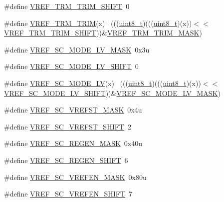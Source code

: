 \begin{DoxyCompactItemize}
\#define \hyperlink{group___v_r_e_f___register___masks_ga7738b4edb18c8c9dcb36d6be564c80e6}{V\+R\+E\+F\+\_\+\+T\+R\+M\+\_\+\+T\+R\+I\+M\+\_\+\+S\+H\+I\+FT}~0
\item 
\#define \hyperlink{group___v_r_e_f___register___masks_gac340a7abf4c9caf1594346d71a475a30}{V\+R\+E\+F\+\_\+\+T\+R\+M\+\_\+\+T\+R\+IM}(x)                                              ~(((\hyperlink{_p_e___types_8h_aba7bc1797add20fe3efdf37ced1182c5}{uint8\+\_\+t})(((\hyperlink{_p_e___types_8h_aba7bc1797add20fe3efdf37ced1182c5}{uint8\+\_\+t})(x))$<$$<$\hyperlink{group___v_r_e_f___register___masks_ga7738b4edb18c8c9dcb36d6be564c80e6}{V\+R\+E\+F\+\_\+\+T\+R\+M\+\_\+\+T\+R\+I\+M\+\_\+\+S\+H\+I\+FT}))\&\hyperlink{group___v_r_e_f___register___masks_gaf233ddf56401003ec721b808d3910978}{V\+R\+E\+F\+\_\+\+T\+R\+M\+\_\+\+T\+R\+I\+M\+\_\+\+M\+A\+SK})
\item 
\#define \hyperlink{group___v_r_e_f___register___masks_ga7eb8ab4b25ed9f93b23d7199c50e7181}{V\+R\+E\+F\+\_\+\+S\+C\+\_\+\+M\+O\+D\+E\+\_\+\+L\+V\+\_\+\+M\+A\+SK}~0x3u
\item 
\#define \hyperlink{group___v_r_e_f___register___masks_ga3130891ca865a042a784a2c3bc7141b0}{V\+R\+E\+F\+\_\+\+S\+C\+\_\+\+M\+O\+D\+E\+\_\+\+L\+V\+\_\+\+S\+H\+I\+FT}~0
\item 
\#define \hyperlink{group___v_r_e_f___register___masks_gada46f0a4d5c228d2193c8f292631265f}{V\+R\+E\+F\+\_\+\+S\+C\+\_\+\+M\+O\+D\+E\+\_\+\+LV}(x)                                          ~(((\hyperlink{_p_e___types_8h_aba7bc1797add20fe3efdf37ced1182c5}{uint8\+\_\+t})(((\hyperlink{_p_e___types_8h_aba7bc1797add20fe3efdf37ced1182c5}{uint8\+\_\+t})(x))$<$$<$\hyperlink{group___v_r_e_f___register___masks_ga3130891ca865a042a784a2c3bc7141b0}{V\+R\+E\+F\+\_\+\+S\+C\+\_\+\+M\+O\+D\+E\+\_\+\+L\+V\+\_\+\+S\+H\+I\+FT}))\&\hyperlink{group___v_r_e_f___register___masks_ga7eb8ab4b25ed9f93b23d7199c50e7181}{V\+R\+E\+F\+\_\+\+S\+C\+\_\+\+M\+O\+D\+E\+\_\+\+L\+V\+\_\+\+M\+A\+SK})
\item 
\#define \hyperlink{group___v_r_e_f___register___masks_gadc4f84c737775ee82f350149ade8f5bf}{V\+R\+E\+F\+\_\+\+S\+C\+\_\+\+V\+R\+E\+F\+S\+T\+\_\+\+M\+A\+SK}~0x4u
\item 
\#define \hyperlink{group___v_r_e_f___register___masks_ga88b36251362ceabbeeb2302dae65000d}{V\+R\+E\+F\+\_\+\+S\+C\+\_\+\+V\+R\+E\+F\+S\+T\+\_\+\+S\+H\+I\+FT}~2
\item 
\#define \hyperlink{group___v_r_e_f___register___masks_ga1396c56eb73d89394a57b1f83f20c9ea}{V\+R\+E\+F\+\_\+\+S\+C\+\_\+\+R\+E\+G\+E\+N\+\_\+\+M\+A\+SK}~0x40u
\item 
\#define \hyperlink{group___v_r_e_f___register___masks_gacfe64ba6f4a76a4aef274f2fedb95a90}{V\+R\+E\+F\+\_\+\+S\+C\+\_\+\+R\+E\+G\+E\+N\+\_\+\+S\+H\+I\+FT}~6
\item 
\#define \hyperlink{group___v_r_e_f___register___masks_ga2df8186aa60a77e25e67589bc50ce539}{V\+R\+E\+F\+\_\+\+S\+C\+\_\+\+V\+R\+E\+F\+E\+N\+\_\+\+M\+A\+SK}~0x80u
\item 
\#define \hyperlink{group___v_r_e_f___register___masks_gaca5e397ea8b43f55854f4a6b80ec479b}{V\+R\+E\+F\+\_\+\+S\+C\+\_\+\+V\+R\+E\+F\+E\+N\+\_\+\+S\+H\+I\+FT}~7
\end{DoxyCompactItemize}


